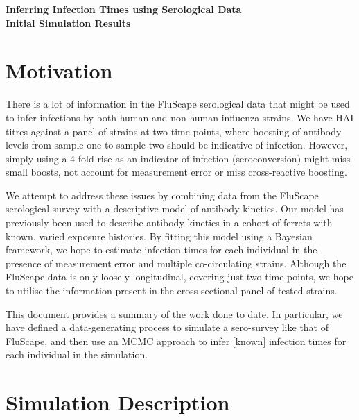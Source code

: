 \documentclass[a4paper,11pt,twoside]{article}
\begin{document}
\begin{center}
  \textbf{\LARGE Inferring Infection Times using Serological Data}\\[.5cm]
  \textbf{\Large Initial Simulation Results}\\[.5cm]
\end{center}

\section{Motivation}
There is a lot of information in the FluScape serological data that might be used to infer infections by both human and non-human influenza strains. We have HAI titres against a panel of strains at two time points, where boosting of antibody levels from sample one to sample two should be indicative of infection. However, simply using a 4-fold rise as an indicator of infection (seroconversion) might miss small boosts, not account for measurement error or miss cross-reactive boosting. 

We attempt to address these issues by combining data from the FluScape serological survey with a descriptive model of antibody kinetics. Our model has previously been used to describe antibody kinetics in a cohort of ferrets with known, varied exposure histories. By fitting this model using a Bayesian framework, we hope to estimate infection times for each individual in the presence of measurement error and multiple co-circulating strains. Although the FluScape data is only loosely longitudinal, covering just two time points, we hope to utilise the information present in the cross-sectional panel of tested strains.

This document provides a summary of the work done to date. In particular, we have defined a data-generating process to simulate a sero-survey like that of FluScape, and then use an MCMC approach to infer [known] infection times for each individual in the simulation.

\section{Simulation Description}
\end{document}
